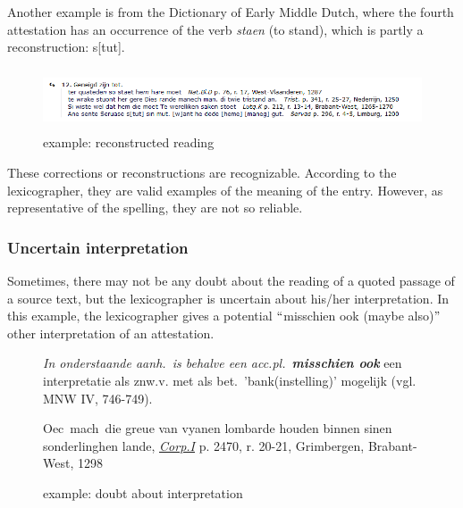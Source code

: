 \documentclass[10pt]{article}
\begin{document}
 Another example is from the Dictionary of Early Middle Dutch, where the fourth attestation has an occurrence of the verb \textit{staen }(to stand), which is partly a reconstruction: s[tut].\par



\begin{figure}[H]
	\begin{Center}
		\includegraphics[width=6.27in,height=0.72in]{./image15.png}
	\end{Center}
	\caption{example: reconstructed reading}
\end{figure}


These corrections or reconstructions are recognizable. According to the lexicographer, they are valid examples of the meaning of the entry. However, as representative of the spelling, they are not so reliable.\par



\subsubsection*{Uncertain interpretation}



Sometimes, there may not be any doubt about the reading of a quoted passage of a source text, but the lexicographer is uncertain about his/her interpretation. In this example, the lexicographer gives a potential $``$misschien ook (maybe also)$"$  other interpretation of an attestation.

\bigskip

\begin{figure}[H]
\begin{minipage}{14cm}
{
\small
\textit{In onderstaande aanh.~is behalve een acc.pl.~}\textbf{\textit{misschien ook}}  een interpretatie als znw.v. met als bet.~'bank(instelling)' mogelijk (vgl. MNW IV, 746-749).


 Oec\ mach\ die greue van vyanen lombarde houden binnen sinen sonderlinghen lande,   \href{http://gtb.ivdnt.org/iWDB/search?actie=article&wdb=VMNWBRONNEN&id=1646}{\textit{\uline{Corp.I}}} p. 2470, r. 20-21, Grimbergen, Brabant-West, 1298
}
\end{minipage}
\caption{example: doubt about interpretation}
\end{figure}
\end{document}
